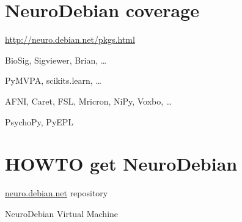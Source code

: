 \documentclass[letterpaper,landscape]{report}
\begin{document}
\begin{multicols}{3}
\section*{NeuroDebian coverage}
\begin{flushright}
\vspace{-0.5em}
\url{http://neuro.debian.net/pkgs.html}
\vspace{-1em}
\end{flushright}
\begin{description}[nolistsep,leftmargin=1pc,topsep=0em]
\item[Electrophysiology] BioSig, Sigviewer, Brian, \ldots
\item[Machine Learning] PyMVPA, scikits.learn, \ldots
\item[Medical Imaging] AFNI, Caret, FSL, Mricron, NiPy, Voxbo, \ldots
\item[Psychophysics] PsychoPy, PyEPL
\end{description}




\section*{HOWTO get NeuroDebian}
\begin{description}[nolistsep,leftmargin=1pc]
\item[Debian/Ubuntu]\url{neuro.debian.net} repository
\item[Others] NeuroDebian Virtual Machine
\end{description}

\end{multicols}
\end{document}
